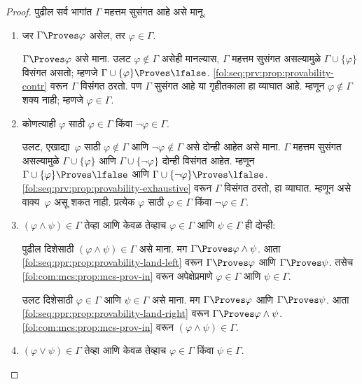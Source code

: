 \begin{proof}
पुढील सर्व भागांत $\Gamma$ महत्तम सुसंगत आहे असे मानू.
\begin{enumerate}
\item जर $\Gamma \Proves \varphi$ असेल, तर $\varphi \in \Gamma$.

$\Gamma \Proves \varphi$ असे माना. उलट $\varphi \notin \Gamma$ असेही
मानल्यास, $\Gamma$ महत्तम सुसंगत असल्यामुळे $\Gamma \cup \{\varphi\}$
विसंगत असतो; म्हणजे $\Gamma \cup \{\varphi\} \Proves \lfalse$.
\ref{fol:seq:prv:prop:provability-contr}
वरून $\Gamma$ विसंगत ठरतो. पण $\Gamma$ सुसंगत आहे या गृहीतकाला
हा व्याघात आहे. म्हणून $\varphi \notin \Gamma$ शक्य नाही; म्हणजे
$\varphi \in \Gamma$.

\item कोणत्याही $\varphi$ साठी $\varphi \in \Gamma$ किंवा $\lnot \varphi \in \Gamma$.

उलट, एखाद्या~$\varphi$ साठी $\varphi \notin \Gamma$ आणि
$\lnot \varphi \notin \Gamma$ असे दोन्ही आहेत असे माना. $\Gamma$ महत्तम
सुसंगत असल्यामुळे $\Gamma \cup \{\varphi\}$ आणि $\Gamma \cup \{\lnot \varphi\}$
दोन्ही विसंगत आहेत. म्हणून $\Gamma \cup \{\varphi\} \Proves \lfalse$
आणि $\Gamma \cup \{\lnot \varphi\} \Proves \lfalse$.
\ref{fol:seq:prv:prop:provability-exhaustive}
वरून $\Gamma$ विसंगत ठरतो, हा व्याघात. म्हणून असे वाक्य~$\varphi$
असू शकत नाही. प्रत्येक $\varphi$ साठी $\varphi \in \Gamma$ किंवा
$\lnot \varphi \in \Gamma$.

\item

$(\varphi \land \psi) \in \Gamma$ तेव्हा आणि केवळ तेव्हाच $\varphi \in \Gamma$
आणि $\psi \in \Gamma$ ही दोन्ही:

पुढील दिशेसाठी $(\varphi \land \psi) \in \Gamma$ असे माना. मग
$\Gamma \Proves \varphi \land \psi$. आता
\ref{fol:seq:ppr:prop:provability-land-left}
वरून $\Gamma \Proves \varphi$ आणि $\Gamma \Proves \psi$. तसेच
\ref{fol:com:mcs:prop:mcs-prov-in} वरून अपेक्षेप्रमाणे $\varphi \in \Gamma$
आणि $\psi \in \Gamma$.

उलट दिशेसाठी $\varphi \in \Gamma$ आणि $\psi \in \Gamma$ असे माना.
मग $\Gamma \Proves \varphi$ आणि $\Gamma \Proves \psi$. आता
\ref{fol:seq:ppr:prop:provability-land-right}
वरून $\Gamma \Proves \varphi \land \psi$. \ref{fol:com:mcs:prop:mcs-prov-in}
वरून $(\varphi \land \psi) \in \Gamma$.

\item

$(\varphi \lor \psi) \in \Gamma$ तेव्हा आणि केवळ तेव्हाच $\varphi \in \Gamma$
किंवा $\psi \in \Gamma$.


\end{enumerate}
\end{proof}
